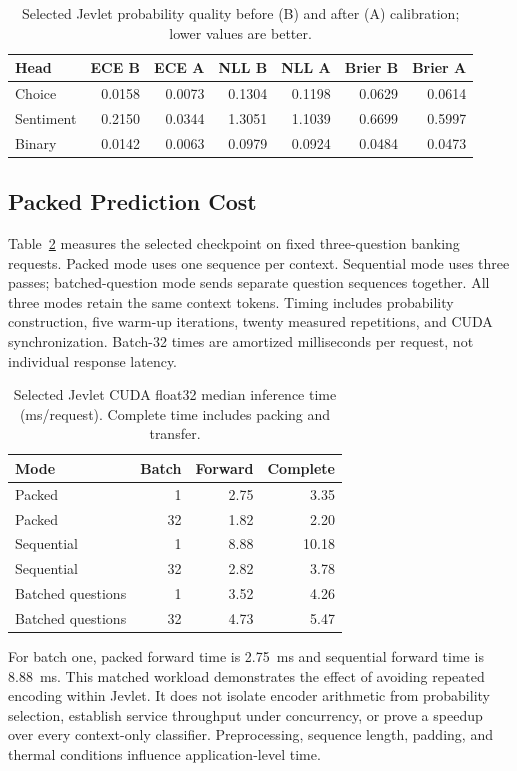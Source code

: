 \documentclass[conference]{IEEEtran}
\begin{document}
\begin{table}[t]
\caption{Selected Jevlet probability quality before (B) and after (A) calibration; lower values are better.}
\label{tab:calibration}\centering\small
\begin{tabular}{lrrrrrr}\toprule
Head & ECE B & ECE A & NLL B & NLL A & Brier B & Brier A\\\midrule
Choice & 0.0158 & 0.0073 & 0.1304 & 0.1198 & 0.0629 & 0.0614 \\
Sentiment & 0.2150 & 0.0344 & 1.3051 & 1.1039 & 0.6699 & 0.5997 \\
Binary & 0.0142 & 0.0063 & 0.0979 & 0.0924 & 0.0484 & 0.0473 \\
\bottomrule\end{tabular}\end{table}

\subsection{Packed Prediction Cost}
Table~\ref{tab:timing} measures the selected checkpoint on fixed three-question banking requests. Packed mode uses one sequence per context. Sequential mode uses three passes; batched-question mode sends separate question sequences together. All three modes retain the same context tokens. Timing includes probability construction, five warm-up iterations, twenty measured repetitions, and CUDA synchronization. Batch-32 times are amortized milliseconds per request, not individual response latency.

\begin{table}[t]
\caption{Selected Jevlet CUDA float32 median inference time (ms/request). Complete time includes packing and transfer.}
\label{tab:timing}\centering\footnotesize
\begin{tabular}{lrrr}\toprule
Mode & Batch & Forward & Complete\\\midrule
Packed & 1 & 2.75 & 3.35 \\
Packed & 32 & 1.82 & 2.20 \\
Sequential & 1 & 8.88 & 10.18 \\
Sequential & 32 & 2.82 & 3.78 \\
Batched questions & 1 & 3.52 & 4.26 \\
Batched questions & 32 & 4.73 & 5.47 \\
\bottomrule\end{tabular}\end{table}

For batch one, packed forward time is 2.75~ms and sequential forward time is 8.88~ms. This matched workload demonstrates the effect of avoiding repeated encoding within Jevlet. It does not isolate encoder arithmetic from probability selection, establish service throughput under concurrency, or prove a speedup over every context-only classifier. Preprocessing, sequence length, padding, and thermal conditions influence application-level time.
\end{document}
